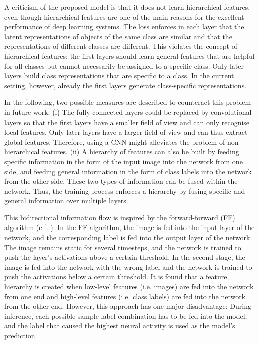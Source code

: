 A criticism of the proposed model is that it does not learn hierarchical features, even though hierarchical features are one of the main reasons for the excellent performance of deep learning systems. The loss enforces in each layer that the latent representations of objects of the same class are similar and that the representations of different classes are different. This violates the concept of hierarchical features; the first layers should learn general features that are helpful for all classes but cannot necessarily be assigned to a specific class. Only later layers build class representations that are specific to a class. In the current setting, however, already the first layers generate class-specific representations.

In the following, two possible measures are described to counteract this problem in future work: (i) The fully connected layers could be replaced by convolutional layers so that the first layers have a smaller field of view and can only recognise local features. Only later layers have a larger field of view and can thus extract global features. Therefore, using a CNN might alleviates the problem of non-hierarchical features. (ii) A hierarchy of features can also be built by feeding specific information in the form of the input image into the network from one side, and feeding general information in the form of class labels into the network from the other side. These two types of information can be fused within the network. Thus, the training process enforces a hierarchy by fusing specific and general information over multiple layers.

This bidirectional information flow is inspired by the forward-forward (FF) algorithm  (c.f. ).
In the FF algorithm, the image is fed into the input layer of the network, and the corresponding label is fed into the output layer of the network. The image remains static for several timesteps, and the network is trained to push the layer's activations above a certain threshold. In the second stage, the image is fed into the network with the wrong label and the network is trained to push the activations below a certain threshold. It is found that a feature hierarchy is created when low-level features (i.e. images) are fed into the network from one end and high-level features (i.e. class labels) are fed into the network from the other end. However, this approach has one major disadvantage: During inference, each possible sample-label combination has to be fed into the model, and the label that caused the highest neural activity is used as the model's prediction.

